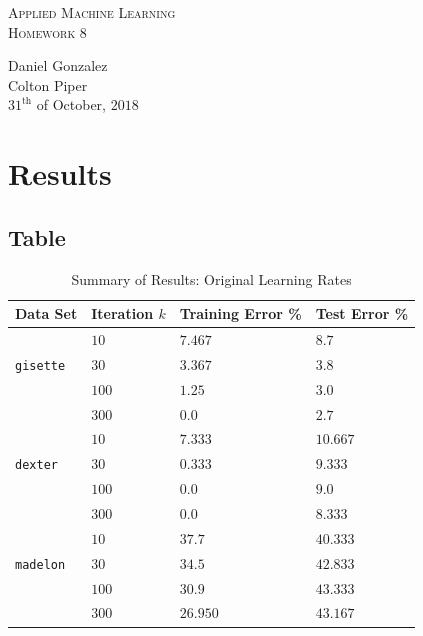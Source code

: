 \documentclass[UTF8]{article}
\begin{document}
\begin{center}
	\textsc{\huge Applied Machine Learning}\\
	\textsc{\Large Homework 8}\\
\end{center}
\begin{flushright}
	Daniel Gonzalez\\
    Colton Piper\\
	$31^{\text{th}}$ of October, $2018$
\end{flushright}


\section{Results}

\subsection{Table}

\begin{table}[H]
\centering
    \caption{Summary of Results: Original Learning Rates}
    \begin{tabular}{|l|l|l|l|}
        \hline
        Data Set & Iteration $k$ & Training Error \% & Test Error \%\\\hline\cline{1-4}
        & $10$ & $7.467$ & $8.7$\\\cline{2-4}
        \texttt{gisette} & $30$ & $3.367$ & $3.8$\\\cline{2-4}
        & $100$ & $1.25$ & $3.0$\\\cline{2-4}
        & $300$ & $0.0$ & $2.7$\\\hline\cline{1-4}

        & $10$ & $7.333$ & $10.667$\\\cline{2-4}
        \texttt{dexter} & $30$ & $0.333$ & $9.333$\\\cline{2-4}
        & $100$ & $0.0$ & $9.0$\\\cline{2-4}
        & $300$ & $0.0$ & $8.333$\\\hline\cline{1-4}

        & $10$ & $37.7$ & $40.333$\\\cline{2-4}
        \texttt{madelon} & $30$ & $34.5$ & $42.833$\\\cline{2-4}
        & $100$ & $30.9$ & $43.333$\\\cline{2-4}
        & $300$ & $26.950$ & $43.167$\\\hline\cline{1-4}
\end{tabular}
\end{table}
\end{document}
